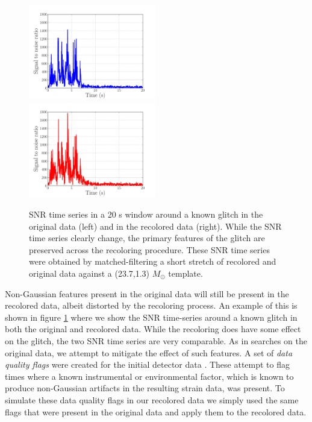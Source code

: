\documentclass[12pt]{iopart}
\begin{document}
\begin{figure}
\centering
\includegraphics[width=0.495\textwidth]
{figure4A}
\includegraphics[width=0.495\textwidth]
{figure4B}
\caption{\label{fig:NOISE_recolored_glitch}
SNR time series in a 20 s window around a known glitch in the original data
(left) and in the recolored data (right). While the SNR time series clearly
change, the primary features of the glitch are preserved across the recoloring
procedure. These SNR time series were obtained by matched-filtering a short 
stretch of recolored and original data against a (23.7,1.3) $M_{\odot}$ 
template.}
\end{figure}

Non-Gaussian features present in the original data will still be present in
the recolored data, albeit distorted by the recoloring process.
An example of this is shown in figure
\ref{fig:NOISE_recolored_glitch} where we show the SNR time-series around a
known glitch in both the original and recolored data. While the recoloring does
have some effect on the glitch, the two SNR time series are very comparable. As
in searches on the original data, we attempt to mitigate the effect of such
features. A set of \emph{data quality flags} were created for the initial 
detector
data \cite{Aasi:2012wd,LIGOS6Detchar}.
These attempt to flag times where a known instrumental or
environmental factor, which is known to produce non-Gaussian artifacts in the
resulting strain data, was present. To simulate these data quality flags in our
recolored data we simply used the same flags that were present in the original
data and apply them to the recolored data.
\end{document}
